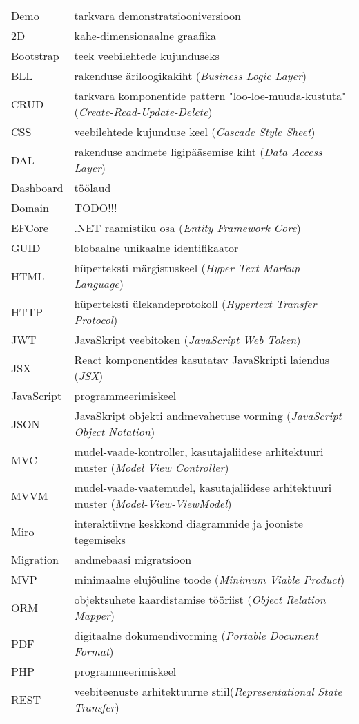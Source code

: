 \begin{longtable}{p{3cm}p{10cm}}
Demo&tarkvara demonstratsiooniversioon\\
2D&kahe-dimensionaalne graafika\\
Bootstrap&teek veebilehtede kujunduseks\\
BLL&rakenduse äriloogikakiht (\emph{Business Logic Layer})\\
CRUD&tarkvara komponentide pattern "loo-loe-muuda-kustuta" (\emph{Create-Read-Update-Delete})\\
CSS&veebilehtede kujunduse keel (\emph{Cascade Style Sheet})\\
DAL&rakenduse andmete ligipääsemise kiht (\emph{Data Access Layer})\\
Dashboard&töölaud\\
Domain&TODO!!!\\
EFCore&.NET raamistiku osa (\emph{Entity Framework Core})\\
GUID&blobaalne unikaalne identifikaator\\
HTML&hüperteksti märgistuskeel (\emph{Hyper Text Markup Language})\\
HTTP&hüperteksti ülekandeprotokoll (\emph{Hypertext Transfer Protocol})\\
JWT&JavaSkript veebitoken (\emph{JavaScript Web Token})\\
JSX&React komponentides kasutatav JavaSkripti laiendus (\emph{JSX})\\
JavaScript&programmeerimiskeel\\
JSON&JavaSkript objekti andmevahetuse vorming (\emph{JavaScript Object Notation})\\
MVC&mudel-vaade-kontroller, kasutajaliidese arhitektuuri muster (\emph{Model View Controller})\\
MVVM&mudel-vaade-vaatemudel, kasutajaliidese arhitektuuri muster (\emph{Model-View-ViewModel})\\
Miro&interaktiivne keskkond diagrammide ja jooniste tegemiseks\\
Migration&andmebaasi migratsioon \\
MVP&minimaalne elujõuline toode (\emph{Minimum Viable Product})\\
ORM&objektsuhete kaardistamise tööriist (\emph{Object Relation Mapper})\\
PDF&digitaalne dokumendivorming (\emph{Portable Document Format})\\
PHP&programmeerimiskeel\\
REST&veebiteenuste arhitektuurne stiil(\emph{Representational State Transfer})\\

\end{longtable}
